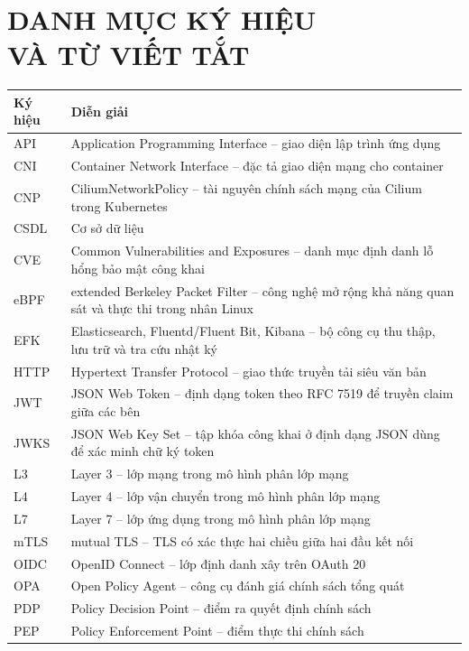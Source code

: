 
\clearpage
{}
\chapter*{\centering DANH MỤC KÝ HIỆU\\[0.4em]VÀ TỪ VIẾT TẮT}

\begin{longtable}{@{}L{2cm}L{11.4cm}@{}}
\toprule
\textbf{Ký hiệu} & \textbf{Diễn giải} \\
\midrule
\endhead
API & Application Programming Interface -- giao diện lập trình ứng dụng \\
CNI & Container Network Interface -- đặc tả giao diện mạng cho container \\
CNP & CiliumNetworkPolicy -- tài nguyên chính sách mạng của Cilium trong Kubernetes \\
CSDL & Cơ sở dữ liệu \\
CVE & Common Vulnerabilities and Exposures -- danh mục định danh lỗ hổng bảo mật công khai \\
eBPF & extended Berkeley Packet Filter -- công nghệ mở rộng khả năng quan sát và thực thi trong nhân Linux \\
EFK & Elasticsearch, Fluentd/Fluent Bit, Kibana -- bộ công cụ thu thập, lưu trữ và tra cứu nhật ký \\
HTTP & Hypertext Transfer Protocol -- giao thức truyền tải siêu văn bản \\
JWT & JSON Web Token -- định dạng token theo RFC 7519 để truyền claim giữa các bên \\
JWKS & JSON Web Key Set -- tập khóa công khai ở định dạng JSON dùng để xác minh chữ ký token \\
L3 & Layer 3 -- lớp mạng trong mô hình phân lớp mạng \\
L4 & Layer 4 -- lớp vận chuyển trong mô hình phân lớp mạng \\
L7 & Layer 7 -- lớp ứng dụng trong mô hình phân lớp mạng \\
mTLS & mutual TLS -- TLS có xác thực hai chiều giữa hai đầu kết nối \\
OIDC & OpenID Connect -- lớp định danh xây trên OAuth 20 \\
OPA & Open Policy Agent -- công cụ đánh giá chính sách tổng quát \\
PDP & Policy Decision Point -- điểm ra quyết định chính sách \\
PEP & Policy Enforcement Point -- điểm thực thi chính sách \\

\end{longtable}
